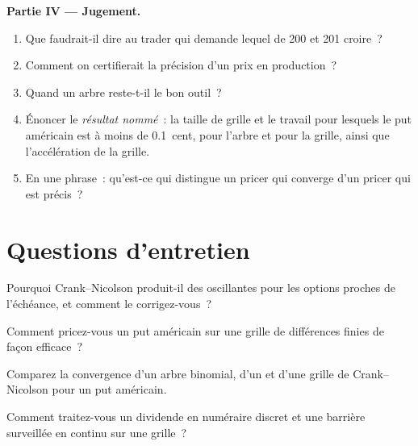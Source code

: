 \begin{problem}
\medskip\noindent\textbf{Partie IV --- Jugement.}
\begin{enumerate}[resume]
\item Que faudrait-il dire au trader qui demande lequel de 200 et 201 croire~?
\item Comment on certifierait la précision d'un prix en production~?
\item Quand un arbre reste-t-il le bon outil~?
\item Énoncer le \emph{résultat nommé}~: la taille de grille et le travail pour lesquels le put américain est à moins de 0.1~cent, pour l'arbre et pour la grille, ainsi que l'accélération de
la grille.
\item En une phrase~: qu'est-ce qui distingue un pricer qui converge d'un pricer qui est précis~?
\end{enumerate}
\end{problem}

\section{Questions d'entretien}

\begin{interviewq}\label{iq:dv:trees-and-finite-difference-pricers-in-practice:1}
Pourquoi Crank--Nicolson produit-il des  oscillantes pour les options proches de l'échéance, et comment le corrigez-vous~?
\end{interviewq}

\begin{interviewq}\label{iq:dv:trees-and-finite-difference-pricers-in-practice:2}
Comment pricez-vous un put américain sur une grille de différences finies de façon efficace~?
\end{interviewq}

\begin{interviewq}\label{iq:dv:trees-and-finite-difference-pricers-in-practice:3}
Comparez la convergence d'un arbre binomial, d'un  et d'une grille de Crank--Nicolson pour un put américain.
\end{interviewq}

\begin{interviewq}\label{iq:dv:trees-and-finite-difference-pricers-in-practice:4}
Comment traitez-vous un dividende en numéraire discret et une barrière surveillée en continu sur une grille~?
\end{interviewq}

